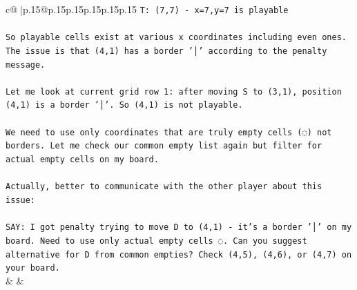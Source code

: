 \documentclass{article}
\begin{document}
{\begin{supertabular}{c@{$\;$}|p{.15\linewidth}@{}p{.15\linewidth}p{.15\linewidth}p{.15\linewidth}p{.15\linewidth}p{.15\linewidth}}
{{{\texttt{T: (7,7) {-} x=7,y=7 is playable} \\
\\ 
\texttt{So playable cells exist at various x coordinates including even ones. The issue is that (4,1) has a border '│' according to the penalty message.} \\
\\ 
\texttt{Let me look at current grid row 1: after moving S to (3,1), position (4,1) is a border '│'. So (4,1) is not playable.} \\
\\ 
\texttt{We need to use only coordinates that are truly empty cells (◌) not borders. Let me check our common empty list again but filter for actual empty cells on my board.} \\
\\ 
\texttt{Actually, better to communicate with the other player about this issue:} \\
\\ 
\texttt{SAY: I got penalty trying to move D to (4,1) {-} it's a border '│' on my board. Need to use only actual empty cells ◌. Can you suggest alternative for D from common empties? Check (4,5), (4,6), or (4,7) on your board.} \\
            }
        }
    }
    & & \\ \\


\end{supertabular}}
\end{document}
